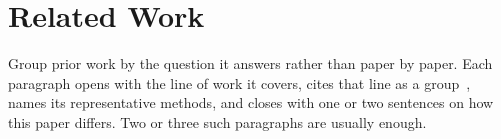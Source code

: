 \section{Related Work}
\label{sec:related-work}

Group prior work by the question it answers rather than paper by paper.
Each paragraph opens with the line of work it covers, cites that line as a group~\citep{brown2020language,wei2022chain}, names its representative methods, and closes with one or two sentences on how this paper differs.
Two or three such paragraphs are usually enough.
